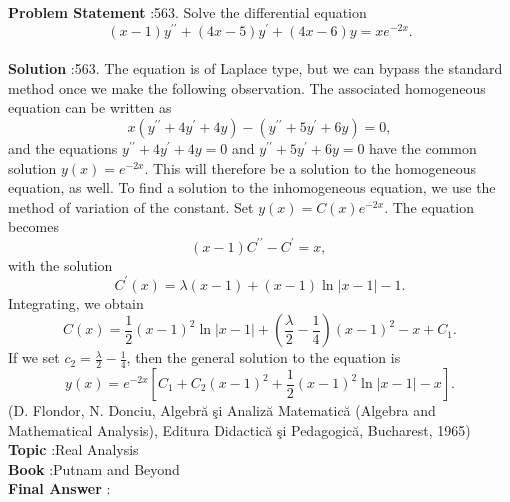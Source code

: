 \documentclass[10pt]{article}
\begin{document}
\textbf{Problem Statement} :563. Solve the differential equation$$ (x-1) y^{\prime \prime}+(4 x-5) y^{\prime}+(4 x-6) y=x e^{-2 x} . $$\\
\textbf{Solution} :563. The equation is of Laplace type, but we can bypass the standard method once we make the following observation. The associated homogeneous equation can be written as$$ x\left(y^{\prime \prime}+4 y^{\prime}+4 y\right)-\left(y^{\prime \prime}+5 y^{\prime}+6 y\right)=0, $$and the equations $y^{\prime \prime}+4 y^{\prime}+4 y=0$ and $y^{\prime \prime}+5 y^{\prime}+6 y=0$ have the common solution $y(x)=e^{-2 x}$. This will therefore be a solution to the homogeneous equation, as well. To find a solution to the inhomogeneous equation, we use the method of variation of the constant. Set $y(x)=C(x) e^{-2 x}$. The equation becomes$$ (x-1) C^{\prime \prime}-C^{\prime}=x \text {, } $$with the solution$$ C^{\prime}(x)=\lambda(x-1)+(x-1) \ln |x-1|-1 . $$Integrating, we obtain$$ C(x)=\frac{1}{2}(x-1)^{2} \ln |x-1|+\left(\frac{\lambda}{2}-\frac{1}{4}\right)(x-1)^{2}-x+C_{1} . $$If we set $c_{2}=\frac{\lambda}{2}-\frac{1}{4}$, then the general solution to the equation is$$ y(x)=e^{-2 x}\left[C_{1}+C_{2}(x-1)^{2}+\frac{1}{2}(x-1)^{2} \ln |x-1|-x\right] . $$(D. Flondor, N. Donciu, Algebră şi Analiză Matematică (Algebra and Mathematical Analysis), Editura Didactică şi Pedagogică, Bucharest, 1965) \\
\textbf{Topic} :Real Analysis\\
\textbf{Book} :Putnam and Beyond\\
\textbf{Final Answer} :\\
\end{document}
